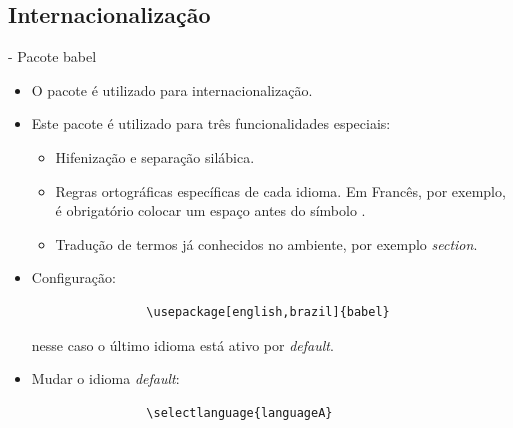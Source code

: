 \documentclass{beamer}
\begin{document}
\subsection{Internacionalização}
\begin{frame}[fragile]{\insertsubsection{} - Pacote babel}
	\begin{itemize}
		\item O pacote  é utilizado para internacionalização.
		\item Este pacote é utilizado para três funcionalidades especiais:
		\begin{itemize}
			\item Hifenização e separação silábica.
			\item Regras ortográficas específicas de cada idioma. Em Francês, por exemplo, é obrigatório colocar um espaço antes do símbolo \keystrokebftt{:}.
			\item Tradução de termos já conhecidos no ambiente, por exemplo \textit{section}.
		\end{itemize}
		\item Configuração: 
			\begin{verbatim}
				\usepackage[english,brazil]{babel}
			\end{verbatim}
			nesse caso o último idioma está ativo por \textit{default}.
			
		\item Mudar o idioma \textit{default}:
			\begin{verbatim}
				\selectlanguage{languageA}
			\end{verbatim}

	\end{itemize}
\end{frame}
\end{document}

